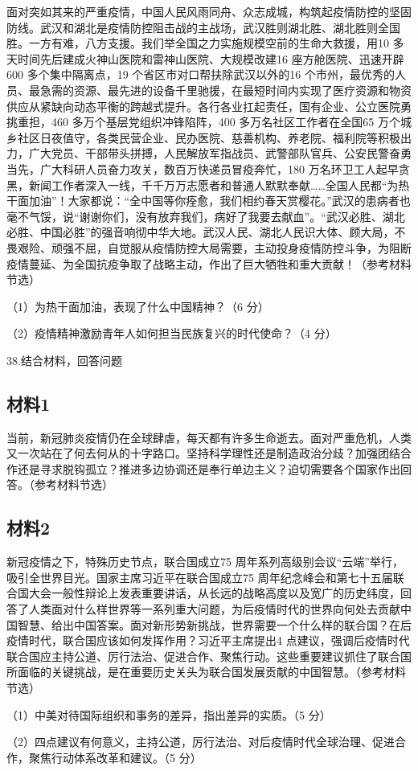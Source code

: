 \documentclass[UTF8,11pt]{ctexart}
\begin{document}
面对突如其来的严重疫情，中国人民风雨同舟、众志成城，构筑起疫情防控的坚固防线。武汉和湖北是疫情防控阻击战的主战场，武汉胜则湖北胜、湖北胜则全国胜。一方有难，八方支援。我们举全国之力实施规模空前的生命大救援，用10 多天时间先后建成火神山医院和雷神山医院、大规模改建16 座方舱医院、迅速开辟600 多个集中隔离点，19 个省区市对口帮扶除武汉以外的16 个市州，最优秀的人员、最急需的资源、最先进的设备千里驰援，在最短时间内实现了医疗资源和物资供应从紧缺向动态平衡的跨越式提升。各行各业扛起责任，国有企业、公立医院勇挑重担，460 多万个基层党组织冲锋陷阵，400 多万名社区工作者在全国65 万个城乡社区日夜值守，各类民营企业、民办医院、慈善机构、养老院、福利院等积极出力，广大党员、干部带头拼搏，人民解放军指战员、武警部队官兵、公安民警奋勇当先，广大科研人员奋力攻关，数百万快递员冒疫奔忙，180 万名环卫工人起早贪黑，新闻工作者深入一线，千千万万志愿者和普通人默默奉献……全国人民都“为热干面加油”！大家都说：“全中国等你痊愈，我们相约春天赏樱花。”武汉的患病者也毫不气馁，说“谢谢你们，没有放弃我们，病好了我要去献血”。“武汉必胜、湖北必胜、中国必胜”的强音响彻中华大地。武汉人民、湖北人民识大体、顾大局，不畏艰险、顽强不屈，自觉服从疫情防控大局需要，主动投身疫情防控斗争，为阻断疫情蔓延、为全国抗疫争取了战略主动，作出了巨大牺牲和重大贡献！（参考材料节选）


（1）为热干面加油，表现了什么中国精神？（6 分）


（2）疫情精神激励青年人如何担当民族复兴的时代使命？（4 分）


38.结合材料，回答问题


\subsection*{材料1}

当前，新冠肺炎疫情仍在全球肆虐，每天都有许多生命逝去。面对严重危机，人类又一次站在了何去何从的十字路口。坚持科学理性还是制造政治分歧？加强团结合作还是寻求脱钩孤立？推进多边协调还是奉行单边主义？迫切需要各个国家作出回答。（参考材料节选）


\subsection*{材料2}

新冠疫情之下，特殊历史节点，联合国成立75 周年系列高级别会议“云端”举行，吸引全世界目光。国家主席习近平在联合国成立75 周年纪念峰会和第七十五届联合国大会一般性辩论上发表重要讲话，从长远的战略高度以及宽广的历史纬度，回答了人类面对什么样世界等一系列重大问题，为后疫情时代的世界向何处去贡献中国智慧、给出中国答案。面对新形势新挑战，世界需要一个什么样的联合国？在后疫情时代，联合国应该如何发挥作用？习近平主席提出4 点建议，强调后疫情时代联合国应主持公道、厉行法治、促进合作、聚焦行动。这些重要建议抓住了联合国所面临的关键挑战，是在重要历史关头为联合国发展贡献的中国智慧。（参考材料节选）


（1）中美对待国际组织和事务的差异，指出差异的实质。（5 分）


（2）四点建议有何意义，主持公道，厉行法治、对后疫情时代全球治理、促进合作，聚焦行动体系改革和建议。（5 分）
\end{document}
